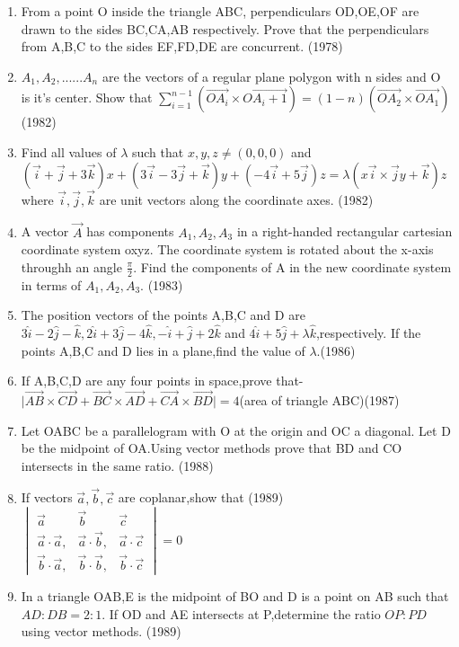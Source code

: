 \documentclass[12pt]{article}
\providecommand{\brak}[1]{\ensuremath{\left(#1\right)}}
\begin{document}
\begin{enumerate}
\item From a point O inside the triangle ABC, perpendiculars OD,OE,OF are drawn to the sides BC,CA,AB respectively. Prove that the perpendiculars from A,B,C to the sides EF,FD,DE are concurrent. (1978)
\item $A_1,A_2,......A_n$ are the vectors of a regular plane polygon with n sides and O is it's center. Show that $\sum_{i=1}^{n-1}\brak{\overrightarrow{OA_i}\times \overrightarrow{OA_i+1}}=\brak{1-n}\brak{\overrightarrow{OA_2}\times\overrightarrow{OA_1}}$  (1982)
\item Find all values of $\lambda$ such that $x,y,z \neq (0,0,0)$ and $\brak{\vec{i}+\vec{j}+3\vec{k}}x+\brak{3\vec{i}-3\vec{j}+\vec{k}}y+\brak{-4\vec{i}+5\vec{j}}z=\lambda \brak{x\vec{i} \times \vec{j}y+\vec{k}}z$ where $\vec{i},\vec{j},\vec{k}$ are unit vectors along the coordinate axes. (1982)
\item A vector $\vec{A}$ has components $A_1,A_2,A_3$ in a right-handed rectangular cartesian coordinate system oxyz. The coordinate system is rotated about the x-axis throughh an angle $\frac{\pi}{2}$. Find the components of A in the new coordinate system in terms of $A_1,A_2,A_3$. (1983)
\item The position vectors of the points A,B,C and D are $3\hat{i}-2\hat{j}-\hat{k},2\hat{i}+3\hat{j}-4\hat{k},-\hat{i}+\hat{j}+2\hat{k}$ and $4\hat{i}+5\hat{j}+\lambda\hat{k}$,respectively. If the points A,B,C and D lies in a plane,find the value of $\lambda$.(1986)
\item If A,B,C,D are any four points in space,prove that-$\mid \overrightarrow{AB} \times \overrightarrow{CD}+\overrightarrow{BC}\times\overrightarrow{AD}+\overrightarrow{CA}\times\overrightarrow{BD}\mid=4$(area of triangle ABC)(1987)
\item Let OABC be a parallelogram with O at the origin and OC a diagonal. Let D be the midpoint of OA.Using vector methods prove that BD and CO intersects in the same ratio. (1988)
\item If vectors $\vec{a},\vec{b},\vec{c}$ are coplanar,show that (1989) \\
$\begin{vmatrix}
\vec{a} &\vec{b} &\vec{c}\\
\vec{a}\cdot \vec{a}, &\vec{a}\cdot \vec{b}, &\vec{a}\cdot\vec{c}\\
\vec{b}\cdot\vec{a}, &\vec{b}\cdot\vec{b}, &\vec{b}\cdot\vec{c}
\end{vmatrix}=0$  
\item In a triangle OAB,E is the midpoint of BO and D is a point on AB such that $AD:DB=2:1$. If OD and AE intersects at P,determine the ratio $OP:PD$ using vector methods. (1989)

\end{enumerate}
\end{document}
